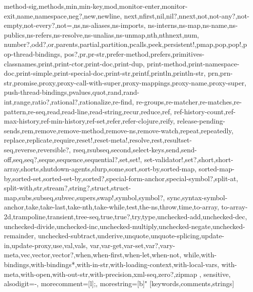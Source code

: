 {{method-sig,methods,min,min-key,mod,monitor-enter,monitor-exit,name,namespace,neg?,new,newline,%
next,nfirst,nil,nil?,nnext,not,not-any?,not-empty,not-every?,not=,ns,ns-aliases,ns-imports,%
ns-interns,ns-map,ns-name,ns-publics,ns-refers,ns-resolve,ns-unalias,ns-unmap,nth,nthnext,num,%
number?,odd?,or,parents,partial,partition,pcalls,peek,persistent!,pmap,pop,pop!,pop-thread-bindings,%
pos?,pr,pr-str,prefer-method,prefers,primitives-classnames,print,print-ctor,print-doc,print-dup,%
print-method,print-namespace-doc,print-simple,print-special-doc,print-str,printf,println,println-str,%
prn,prn-str,promise,proxy,proxy-call-with-super,proxy-mappings,proxy-name,proxy-super,%
push-thread-bindings,pvalues,quot,rand,rand-int,range,ratio?,rational?,rationalize,re-find,%
re-groups,re-matcher,re-matches,re-pattern,re-seq,read,read-line,read-string,recur,reduce,ref,%
ref-history-count,ref-max-history,ref-min-history,ref-set,refer,refer-clojure,reify,%
release-pending-sends,rem,remove,remove-method,remove-ns,remove-watch,repeat,repeatedly,%
replace,replicate,require,reset!,reset-meta!,resolve,rest,resultset-seq,reverse,reversible?,%
rseq,rsubseq,second,select-keys,send,send-off,seq,seq?,seque,sequence,sequential?,set,set!,%
set-validator!,set?,short,short-array,shorts,shutdown-agents,slurp,some,sort,sort-by,sorted-map,%
sorted-map-by,sorted-set,sorted-set-by,sorted?,special-form-anchor,special-symbol?,split-at,%
split-with,str,stream?,string?,struct,struct-map,subs,subseq,subvec,supers,swap!,symbol,symbol?,%
sync,syntax-symbol-anchor,take,take-last,take-nth,take-while,test,the-ns,throw,time,to-array,%
to-array-2d,trampoline,transient,tree-seq,true,true?,try,type,unchecked-add,unchecked-dec,%
unchecked-divide,unchecked-inc,unchecked-multiply,unchecked-negate,unchecked-remainder,%
unchecked-subtract,underive,unquote,unquote-splicing,update-in,update-proxy,use,val,vals,%
var,var-get,var-set,var?,vary-meta,vec,vector,vector?,when,when-first,when-let,when-not,%
while,with-bindings,with-bindings*,with-in-str,with-loading-context,with-local-vars,%
with-meta,with-open,with-out-str,with-precision,xml-seq,zero?,zipmap
},%
   sensitive,%
   alsodigit=-,%
   morecomment=[l];,%
   morestring=[b]"%
  }[keywords,comments,strings]%

\usepackage{pdfpages}

\usepackage{abbreviations}
